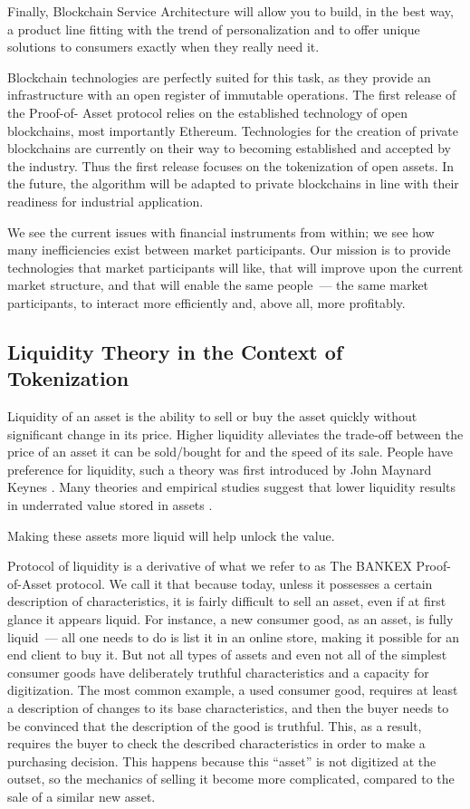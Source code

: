 \documentclass{article}
\begin{document}
\begin{multicols}{2}
Finally, Blockchain Service Architecture will allow you to build, in the best way, a product line fitting with the trend of personalization and to offer unique solutions to consumers exactly when they really need it.

Blockchain technologies are perfectly suited for this task, as they provide an infrastructure with an open register of immutable operations. The first release of the Proof-of- Asset protocol relies on the established technology of open blockchains, most importantly Ethereum. Technologies for the creation of private blockchains are currently on their way to becoming established and accepted by the industry. Thus the first release focuses on the tokenization of open assets. In the future, the algorithm will be adapted to private blockchains in line with their readiness for industrial application.

We see the current issues with financial instruments from within; we see how many inefficiencies exist between market participants. Our mission is to provide technologies that market participants will like, that will improve upon the current market structure, and that will enable the same people~--- the same market participants, to interact more efficiently and, above all, more profitably.

\subsection{Liquidity Theory in the Context of Tokenization}

Liquidity of an asset is the ability to sell or buy the asset quickly without significant change in its price. Higher liquidity alleviates the trade-off between the price of an asset it can be sold/bought for and the speed of its sale. People have preference for liquidity, such a theory was first introduced by John Maynard Keynes \cite{keynes2017}. Many theories and empirical studies suggest that lower liquidity results in underrated value stored in assets \cite{amihud2005}. 

Making these assets more liquid will help unlock the value.

Protocol of liquidity is a derivative of what we refer to as The BANKEX Proof-of-Asset protocol. We call it that because today, unless it possesses a certain description of characteristics, it is fairly difficult to sell an asset, even if at first glance it appears liquid. For instance, a new consumer good, as an asset, is fully liquid~--- all one needs to do is list it in an online store,  making it possible for an end client to buy it. But not all types of assets and even not all of the simplest consumer goods have deliberately truthful characteristics and a capacity for digitization. The most common example, a used consumer good, requires at least a description of changes to its base characteristics, and then the buyer needs to be convinced that the description of the good is truthful. This, as a result, requires the buyer to check the described characteristics in order to make a purchasing decision. This happens because this “asset” is not digitized at the outset, so the mechanics of selling it become more complicated, compared to the sale of a similar new asset. 


\end{multicols}
\end{document}
